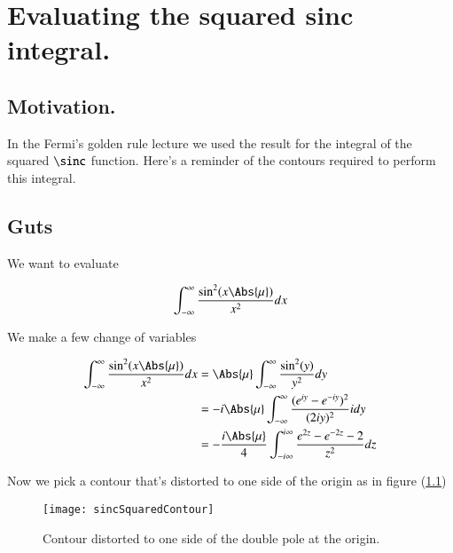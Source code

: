 %
%

\chapter{Evaluating the squared sinc integral.}
\label{chap:sincIntegral}
{}
\date{Dec 10, 2011}

\beginArtWithToc

\section{Motivation.}

In the Fermi's golden rule lecture we used the result for the integral of the squared $\sinc$ function.  Here's a reminder of the contours required to perform this integral.

\section{Guts}

We want to evaluate

\begin{equation}\label{eqn:sincIntegral:10}
\int_{-\infty}^\infty \frac{\sin^2 (x\Abs{\mu})}{x^2} dx
\end{equation}

We make a few change of variables

\begin{align*}
\int_{-\infty}^\infty \frac{\sin^2 (x\Abs{\mu})}{x^2} dx
&=
\Abs{\mu} \int_{-\infty}^\infty \frac{\sin^2 (y)}{y^2} dy \\
&=
-i \Abs{\mu} \int_{-\infty}^\infty \frac{(e^{iy} - e^{-iy})^2}{(2 i y)^2} i dy \\
&=
-\frac{i \Abs{\mu}}{4} \int_{-i\infty}^{i\infty} \frac{e^{2z} - e^{-2z} - 2}{z^2} dz
\end{align*}

Now we pick a contour that's distorted to one side of the origin as in figure (\ref{fig:sincIntegral:sincSquaredContour})
\begin{figure}[htp]
   \centering
   \texttt{[image: sincSquaredContour]}
   \caption{Contour distorted to one side of the double pole at the origin.}\label{fig:sincIntegral:sincSquaredContour}
\end{figure}

